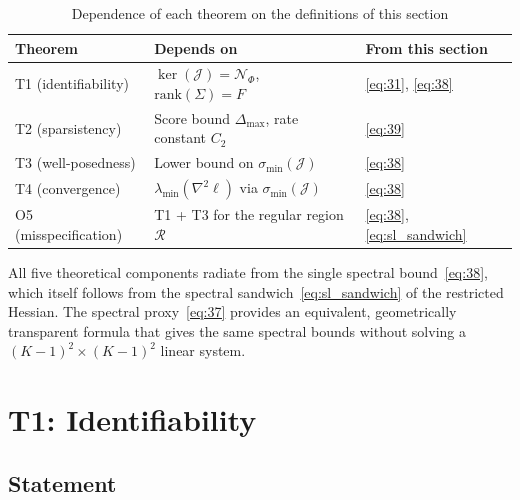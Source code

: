 \documentclass[11pt,a4paper]{article}
\theoremstyle{remark}
\begin{document}
\begin{table}[tbhp]
\centering
\begin{tabular}{lll}
\toprule
Theorem & Depends on & From this section \\
\midrule
T1 (identifiability) & $\ker(\mathcal{J})=\mathcal{N}_\Phi$, $\mathrm{rank}(\Sigma)=F$ & \eqref{eq:31}, \eqref{eq:38} \\
T2 (sparsistency) & Score bound $\Delta_{\max}$, rate constant $C_2$ & \eqref{eq:39} \\
T3 (well-posedness) & Lower bound on $\sigma_{\min}(\mathcal{J})$ & \eqref{eq:38} \\
T4 (convergence) & $\lambda_{\min}(\nabla^2\ell)$ via $\sigma_{\min}(\mathcal{J})$ & \eqref{eq:38} \\
O5 (misspecification) & T1 + T3 for the regular region $\mathcal{R}$ & \eqref{eq:38}, \eqref{eq:sl_sandwich} \\
\bottomrule
\end{tabular}
\caption{Dependence of each theorem on the definitions of this section}
\label{tab:theorem_deps}
\end{table}

All five theoretical components radiate from the single spectral bound~\eqref{eq:38}, which
itself follows from the spectral sandwich~\eqref{eq:sl_sandwich} of the restricted Hessian.
The spectral proxy~\eqref{eq:37} provides an equivalent, geometrically transparent formula
that gives the same spectral bounds without solving a $(K-1)^2\times(K-1)^2$ linear system.

\section{T1: Identifiability}\label{sec:t1}

\subsection{Statement}
\end{document}
